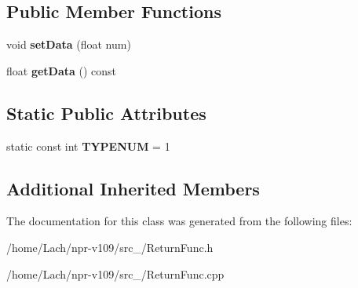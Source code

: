 \subsection*{Public Member Functions}
\begin{DoxyCompactItemize}
\item 
\hypertarget{classReturnFunc_acece0b291362fedc2ffb85260d7265ef}{}\label{classReturnFunc_acece0b291362fedc2ffb85260d7265ef} 
void {\bfseries set\+Data} (float num)
\item 
\hypertarget{classReturnFunc_a8eb9d72e53d31e28be0c471999e9d38b}{}\label{classReturnFunc_a8eb9d72e53d31e28be0c471999e9d38b} 
float {\bfseries get\+Data} () const
\end{DoxyCompactItemize}
\subsection*{Static Public Attributes}
\begin{DoxyCompactItemize}
\item 
\hypertarget{classReturnFunc_af1d2ac69deb830ac09527db1a0938a32}{}\label{classReturnFunc_af1d2ac69deb830ac09527db1a0938a32} 
static const int {\bfseries T\+Y\+P\+E\+N\+UM} = 1
\end{DoxyCompactItemize}
\subsection*{Additional Inherited Members}


The documentation for this class was generated from the following files\+:\begin{DoxyCompactItemize}
\item 
/home/\+Lach/npr-\/v109/src\+\_/Return\+Func.\+h\item 
/home/\+Lach/npr-\/v109/src\+\_/Return\+Func.\+cpp\end{DoxyCompactItemize}
